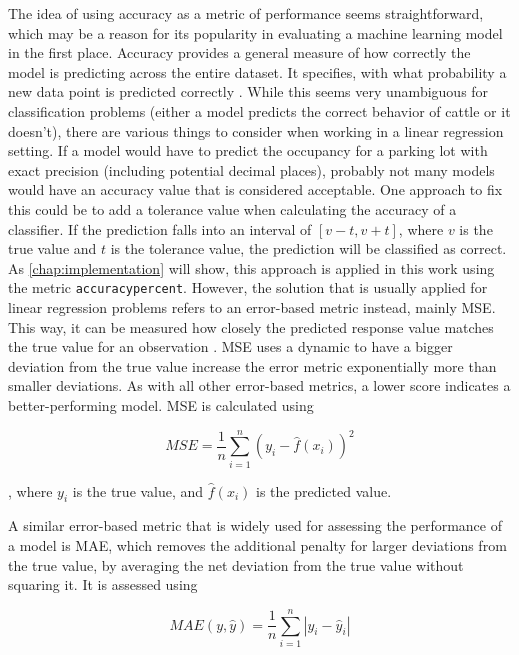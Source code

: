 The idea of using accuracy as a metric of performance seems straightforward, which may be a reason for its popularity in evaluating a machine learning model in the first place. Accuracy provides a general measure of how correctly the model is predicting across the entire dataset. It specifies, with what probability a new data point is predicted correctly \cite{grandini2020}. While this seems very unambiguous for classification problems (either a model predicts the correct behavior of cattle or it doesn’t), there are various things to consider when working in a linear regression setting. If a model would have to predict the occupancy for a parking lot with exact precision (including potential decimal places), probably not many models would have an accuracy value that is considered acceptable. One approach to fix this could be to add a tolerance value when calculating the accuracy of a classifier. If the prediction falls into an interval of $[v-t, v+t]$, where $v$ is the true value and $t$ is the tolerance value, the prediction will be classified as correct. As \autoref{chap:implementation} will show, this approach is applied in this work using the metric \texttt{accuracypercent}. However, the solution that is usually applied for linear regression problems refers to an error-based metric instead, mainly MSE. This way, it can be measured how closely the predicted response value matches the true value for an observation \cite{james2023}. MSE uses a dynamic to have a bigger deviation from the true value increase the error metric exponentially more than smaller deviations. As with all other error-based metrics, a lower score indicates a better-performing model. MSE is calculated using

\begin{equation*}
MSE = \frac{1}{n} \sum_{i=1}^n(y_i - \hat{f}(x_i))^2
\label{mse}
\end{equation*}

, where $y_i$ is the true value, and $\hat{f}(x_i)$ is the predicted value.

A similar error-based metric that is widely used for assessing the performance of a model is MAE, which removes the additional penalty for larger deviations from the true value, by averaging the net deviation from the true value without squaring it. It is assessed using 

\begin{equation*}
MAE(y,\hat{y}) = \frac{1}{n} \sum_{i=1}^n |y_i - \hat{y}_i|
\label{mae}
\end{equation*}

